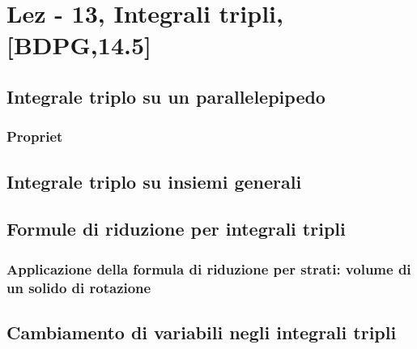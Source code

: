 \section{Lez - 13, Integrali tripli, [BDPG,14.5]}
\subsection{Integrale triplo su un parallelepipedo}
\subsubsection{Propriet\aca}
\subsection{Integrale triplo su insiemi generali}
\subsection{Formule di riduzione per integrali tripli}
\subsubsection{Applicazione della formula di riduzione per strati: volume di un solido di rotazione}
\subsection{Cambiamento di variabili negli integrali tripli}